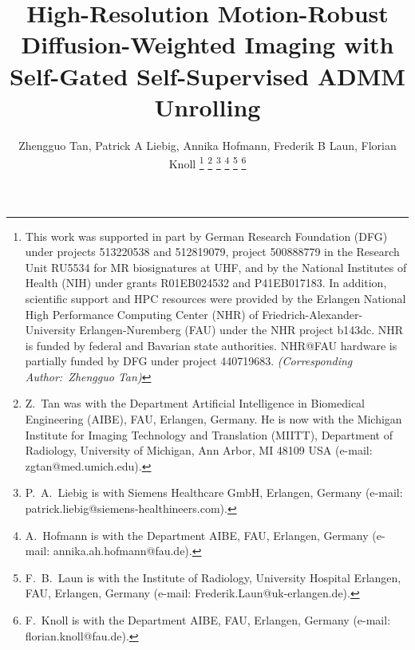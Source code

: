 \documentclass[journal,twoside,web]{ieeecolor}
\begin{document}
	\title{High-Resolution Motion-Robust Diffusion-Weighted Imaging with Self-Gated  Self-Supervised ADMM Unrolling}

	\author{Zhengguo Tan, Patrick A Liebig, Annika Hofmann, Frederik B Laun, Florian Knoll
		\thanks{This work was supported in part by
			German Research Foundation (DFG)
			under projects 513220538 and 512819079,
			project 500888779 in the Research Unit RU5534
			for MR biosignatures at UHF,
			and by the National Institutes of Health (NIH)
			under grants R01EB024532 and P41EB017183.
			In addition, scientific support and HPC resources
			were provided by
			the Erlangen National High Performance Computing Center (NHR)
			of Friedrich-Alexander-University Erlangen-Nuremberg (FAU)
			under the NHR project b143dc.
			NHR is funded by federal and Bavarian state authorities.
			NHR@FAU hardware is partially funded by
			DFG under project 440719683. \textit{(Corresponding Author:~Zhengguo Tan)}}
		\thanks{Z.~Tan was with the Department
			Artificial Intelligence in Biomedical Engineering (AIBE),
			FAU, Erlangen, Germany.
			He is now with
			the Michigan Institute for Imaging Technology and Translation
			(MIITT),
			Department of Radiology,
			University of Michigan, Ann Arbor, MI 48109 USA
			(e-mail: zgtan@med.umich.edu).}
		\thanks{P.~A.~Liebig is with Siemens Healthcare GmbH, Erlangen, Germany
			(e-mail: patrick.liebig@siemens-healthineers.com).}
		\thanks{A.~Hofmann is with the Department AIBE,
			FAU, Erlangen, Germany
			(e-mail: annika.ah.hofmann@fau.de).}
		\thanks{F.~B.~Laun is with the Institute of Radiology,
			University Hospital Erlangen,
			FAU, Erlangen, Germany
			(e-mail: Frederik.Laun@uk-erlangen.de).}
		\thanks{F.~Knoll is with the Department AIBE,
			FAU, Erlangen, Germany
			(e-mail: florian.knoll@fau.de).}
	}

	\maketitle
\end{document}
